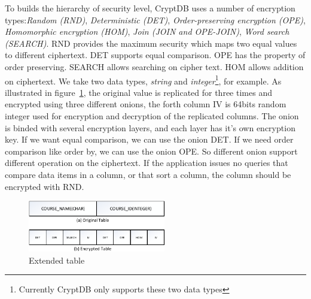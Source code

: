 To builds the hierarchy of security level, CryptDB uses a number of encryption types:\textit{Random (RND)}, \textit{Deterministic (DET)}, \textit{Order-preserving encryption (OPE)}, \textit{Homomorphic encryption (HOM)}, \textit{Join (JOIN and OPE-JOIN)}, \textit{Word search (SEARCH)}.
RND provides the maximum security which maps two equal values to different ciphertext. DET supports equal comparison. OPE has the property of order preserving. SEARCH allows searching on cipher text. HOM allows addition on ciphertext. We take two data types, \emph{string} and \emph{integer}\footnote{Currently CryptDB only supports these two data types}, for example. As illustrated in figure~\ref{fig:stackx}, the original value is replicated for three times and encrypted using three different onions, the forth column IV is 64bits random integer used for encryption and decryption of the replicated columns. The onion is binded with several encryption layers, and each layer has it's own encryption key. If we want equal comparison, we can use the onion DET. If we need order comparison like order by, we can use the onion OPE. So different onion support different operation on the ciphertext. If the application issues no queries that compare data items in a column, or that sort a column, the column should be encrypted with RND.




\begin{figure}[tb]
\centering
\includegraphics[width=6cm]{images/extend.pdf}
\caption{Extended table}
\label{fig:stackx}
\end{figure}

